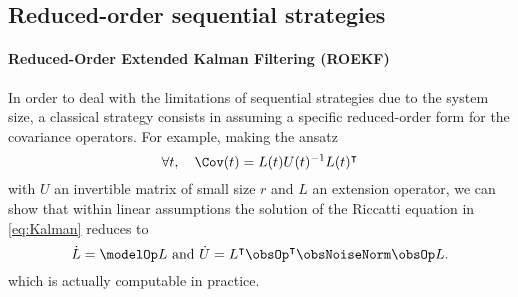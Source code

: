 \documentclass{tufte-book}
\begin{document}
\subsection{Reduced-order sequential strategies}\label{sec:RO}

\paragraph{Reduced-Order Extended Kalman Filtering (ROEKF)}

In order to deal with the limitations of sequential strategies due to the system size, a classical strategy consists in assuming a specific reduced-order form for the covariance operators. For example, making the ansatz
\begin{equation}\label{eq:red-order-princ}
	\forall t,\quad \Cov(t) = L(t) U(t)^{-1} L(t)^\intercal
\end{equation}
with $U$ an invertible matrix of small size $r$ and $L$ an extension operator, we can show that within linear assumptions the solution of the Riccatti equation in \eqref{eq:Kalman} reduces to
\begin{equation}\label{eq:reducedDynamics}
	\dot{L} = \modelOp L \text{ and }
	\dot{U} = L^\intercal \obsOp^\intercal \obsNoiseNorm \obsOp L.
\end{equation}
which is actually computable in practice.
\end{document}
